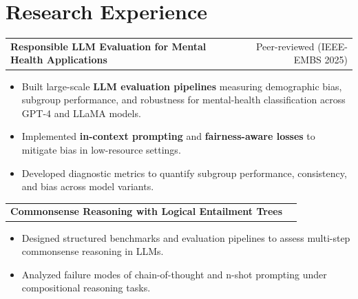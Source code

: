 \documentclass[a4paper,11pt]{article}
\begin{document}

\color{BlueViolet}
\section{Research Experience}
\color{black}

\begin{tabularx}{\linewidth}{ @{}X r@{} }
  \textbf{Responsible LLM Evaluation for Mental Health Applications} & Peer-reviewed (IEEE-EMBS 2025)\\
\end{tabularx}
\begin{itemize}[nosep, after=\strut, leftmargin=1.5em, itemsep=2pt]
  \item Built large-scale \textbf{LLM evaluation pipelines} measuring demographic bias, subgroup performance, and robustness for mental-health classification across GPT-4 and LLaMA models.
  \item Implemented \textbf{in-context prompting} and \textbf{fairness-aware losses} to mitigate bias in low-resource settings.
  \item Developed diagnostic metrics to quantify subgroup performance, consistency, and bias across model variants.
\end{itemize}

\begin{tabularx}{\linewidth}{ @{}X r@{} }
  \textbf{Commonsense Reasoning with Logical Entailment Trees} & \\
\end{tabularx}
\begin{itemize}[nosep, after=\strut, leftmargin=1.5em, itemsep=2pt]
  \item Designed structured benchmarks and evaluation pipelines to assess multi-step commonsense reasoning in LLMs.
  \item Analyzed failure modes of chain-of-thought and n-shot prompting under compositional reasoning tasks.
\end{itemize}

\color{BlueViolet}
\end{document}
